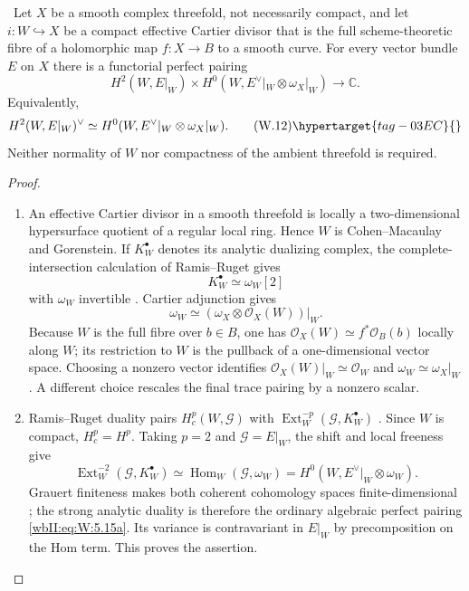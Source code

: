\begin{proposition}
\hypertarget{tag-03IJ}{}\label{wbII:prop:cartier-duality-absolute}

\ Let $X$ be a smooth complex threefold, not necessarily compact,
and let $i:W\hookrightarrow X$ be a compact effective Cartier divisor that
is the full scheme-theoretic fibre of a holomorphic map $f:X\to B$ to a
smooth curve.  For every vector bundle $E$ on $X$ there is a functorial
perfect pairing
\[
 H^2(W,E|_W)\times
 H^0(W,E^\vee|_W\otimes\omega_X|_W)\longrightarrow\mathbb C.
\]
Equivalently,
\[
 H^2(W,E|_W)^\vee\simeq
 H^0(W,E^\vee|_W\otimes\omega_X|_W).
\tag{W.12}\hypertarget{tag-03EC}{}\label{wbII:eq:W:5.15a}
\]
Neither normality of $W$ nor compactness of the ambient threefold is
required.
\end{proposition}



\begin{proof}

\begin{enumerate}[label={$\langle1\rangle$\arabic*.},leftmargin=*]
\item An effective Cartier divisor in a smooth threefold is locally a
two-dimensional hypersurface quotient of a regular local ring.  Hence $W$
is Cohen--Macaulay and Gorenstein.  If $K_W^\bullet$ denotes its analytic
dualizing complex, the complete-intersection calculation of Ramis--Ruget
gives
\[
 K_W^\bullet\simeq\omega_W[2]
\]
with $\omega_W$ invertible
\cite[Proposition~2 and the complete-intersection calculation,
pp.~90--91]{RR70push}.  Cartier adjunction gives
\[
 \omega_W\simeq
 (\omega_X\otimes\mathcal O_X(W))|_W.
\]
Because $W$ is the full fibre over $b\in B$, one has
$\mathcal O_X(W)\simeq f^*\mathcal O_B(b)$ locally along $W$; its
restriction to $W$ is the pullback of a one-dimensional vector space.
Choosing a nonzero vector identifies
$\mathcal O_X(W)|_W\simeq\mathcal O_W$ and
$\omega_W\simeq\omega_X|_W$.  A different choice rescales the final trace
pairing by a nonzero scalar.

\item Ramis--Ruget duality pairs $H_c^p(W,\mathcal G)$ with
$\operatorname{Ext}^{-p}_W(\mathcal G,K_W^\bullet)$
\cite[Theorem~2, pp.~82--83]{RR70push}.  Since $W$ is compact,
$H_c^p=H^p$.  Taking $p=2$ and $\mathcal G=E|_W$, the shift and local
freeness give
\[
 \operatorname{Ext}^{-2}_W(\mathcal G,K_W^\bullet)
 \simeq\operatorname{Hom}_W(\mathcal G,\omega_W)
 =H^0(W,E^\vee|_W\otimes\omega_W).
\]
Grauert finiteness makes both coherent cohomology spaces finite-dimensional
\cite{Grauert1960D}; the strong analytic duality is therefore the ordinary
algebraic perfect pairing \eqref{wbII:eq:W:5.15a}.  Its variance is contravariant in $E|_W$
by precomposition on the Hom term.  This proves the assertion.

\end{enumerate}
\end{proof}